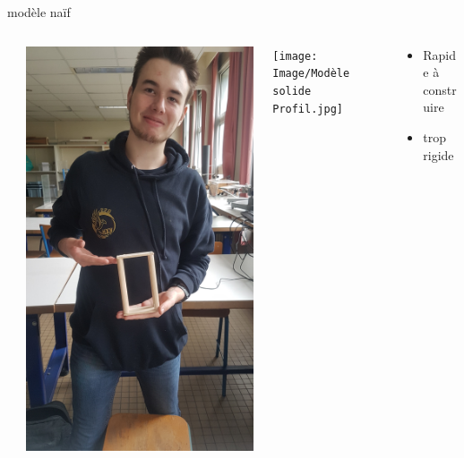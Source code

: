 \documentclass{beamer}
\begin{document}
\begin{frame}{modèle naïf}
\begin{columns}
\begin{column}{0.25\textwidth}
		\end{column}
		\begin{column}{0.25\textwidth}
		\includegraphics[width=\textwidth]{Image/Photo Mateïs échelle modèle solide.jpg}
			
		\end{column}
		\begin{column}{0.25\textwidth}
		\texttt{[image: Image/Modèle solide Profil.jpg]}
		
		\end{column}
		\begin{column}{0.25\textwidth}
			\begin{itemize}
				\item Rapide à construire 
				\item trop rigide
			\end{itemize}
		\end{column}
		\end{columns}
		
	\end{frame}
\end{document}
